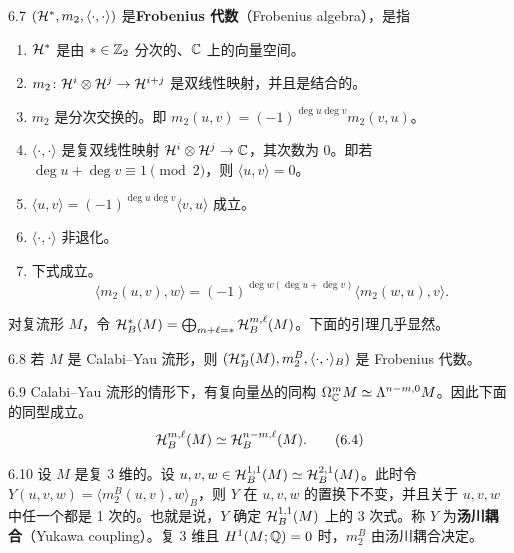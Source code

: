 \begin{definition}{6.7}
  $(\mathcal{H}^*,m_2,\langle\cdot,\cdot\rangle)$ 是\textbf{Frobenius 代数}（Frobenius algebra），是指
  \begin{enumerate}[label=(\arabic*),leftmargin=2.2em,itemsep=1pt,topsep=2pt]
    \item $\mathcal{H}^*$ 是由 $*\in\mathbb{Z}_2$ 分次的、$\mathbb{C}$ 上的向量空间。
    \item $m_2\colon\mathcal{H}^i\otimes\mathcal{H}^j\to\mathcal{H}^{i+j}$ 是双线性映射，并且是结合的。
    \item $m_2$ 是分次交换的。即 $m_2(u,v)=(-1)^{\deg u\deg v}m_2(v,u)$。
    \item $\langle\cdot,\cdot\rangle$ 是复双线性映射 $\mathcal{H}^i\otimes\mathcal{H}^j\to\mathbb{C}$，其次数为 0。即若 $\deg u+\deg v\equiv1\pmod 2$，则 $\langle u,v\rangle=0$。
    \item $\langle u,v\rangle=(-1)^{\deg u\deg v}\langle v,u\rangle$ 成立。
    \item $\langle\cdot,\cdot\rangle$ 非退化。
    \item 下式成立。
    \begin{equation}
      \langle m_2(u,v),w\rangle=(-1)^{\deg w(\deg u+\deg v)}\langle m_2(w,u),v\rangle. \tag{6.3}
    \end{equation}
  \end{enumerate}
\end{definition}

对复流形 $M$，令 $\mathcal{H}_B^*(M)=\bigoplus_{m+\ell=*}\mathcal{H}_B^{m,\ell}(M)$。下面的引理几乎显然。

\begin{lemma}{6.8}
  若 $M$ 是 Calabi–Yau 流形，则 $(\mathcal{H}_B^*(M),m_2^B,\langle\cdot,\cdot\rangle_B)$ 是 Frobenius 代数。
\end{lemma}

\begin{remark}{6.9}
  Calabi–Yau 流形的情形下，有复向量丛的同构 $\Omega^m_{\mathbb{C}} M\simeq\Lambda^{n-m,0}M$。因此下面的同型成立。
  \begin{equation}
    \mathcal{H}_B^{m,\ell}(M)\simeq\mathcal{H}_B^{n-m,\ell}(M). \tag{6.4}
  \end{equation}
\end{remark}

\begin{example}{6.10}
  设 $M$ 是复 3 维的。设 $u,v,w\in\mathcal{H}_B^{1,1}(M)\simeq\mathcal{H}_B^{2,1}(M)$。此时令 $Y(u,v,w)=\langle m_2^B(u,v),w\rangle_B$，则 $Y$ 在 $u,v,w$ 的置换下不变，并且关于 $u,v,w$ 中任一个都是 1 次的。也就是说，$Y$ 确定 $\mathcal{H}_B^{1,1}(M)$ 上的 3 次式。称 $Y$ 为\textbf{汤川耦合}（Yukawa coupling）。复 3 维且 $H^1(M;\mathbb{Q})=0$ 时，$m_2^B$ 由汤川耦合决定。
\end{example}

